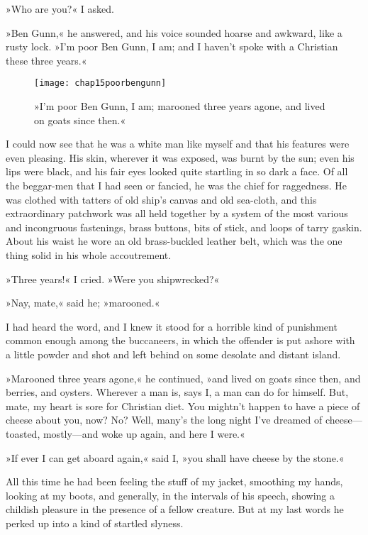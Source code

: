 »Who are you?« I asked.

»Ben Gunn,« he answered, and his voice sounded hoarse and awkward, like a rusty lock. »I'm poor Ben Gunn, I am; and I haven't spoke with a Christian these three years.«

  \begin{figure}[p]
\centering
\texttt{[image: chap15poorbengunn]}
\caption[»I'm poor Ben Gunn, I am«]{»I'm poor Ben Gunn, I am; marooned three years agone, and lived on goats since then.«}
\end{figure}

I could now see that he was a white man like myself and that his features were even pleasing. His skin, wherever it was exposed, was burnt by the sun; even his lips were black, and his fair eyes looked quite startling in so dark a face. Of all the beggar-men that I had seen or fancied, he was the chief for raggedness. He was clothed with tatters of old ship's canvas and old sea-cloth, and this extraordinary patchwork was all held together by a system of the most various and incongruous fastenings, brass buttons, bits of stick, and loops of tarry gaskin. About his waist he wore an old brass-buckled leather belt, which was the one thing solid in his whole accoutrement.

»Three years!« I cried. »Were you shipwrecked?«

»Nay, mate,« said he; »marooned.«

I had heard the word, and I knew it stood for a horrible kind of punishment common enough among the buccaneers, in which the offender is put ashore with a little powder and shot and left behind on some desolate and distant island.

»Marooned three years agone,« he continued, »and lived on goats since then, and berries, and oysters. Wherever a man is, says I, a man can do for himself. But, mate, my heart is sore for Christian diet. You mightn't happen to have a piece of cheese about you, now? No? Well, many's the long night I've dreamed of cheese—toasted, mostly—and woke up again, and here I were.«

»If ever I can get aboard again,« said I, »you shall have cheese by the stone.«

All this time he had been feeling the stuff of my jacket, smoothing my hands, looking at my boots, and generally, in the intervals of his speech, showing a childish pleasure in the presence of a fellow creature. But at my last words he perked up into a kind of startled slyness.

